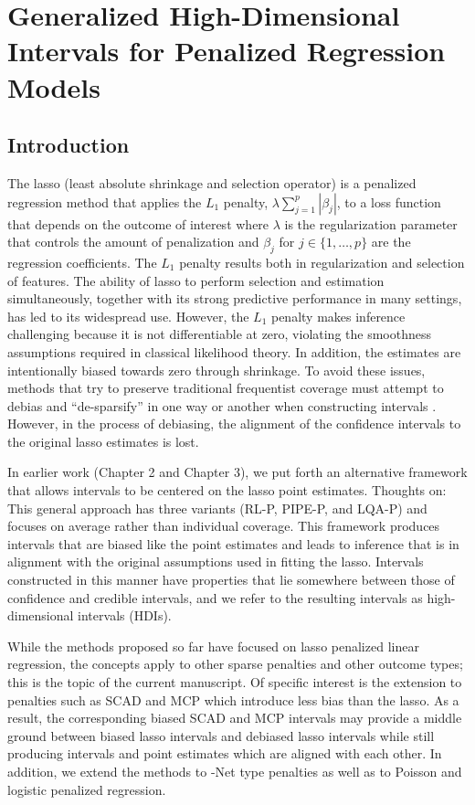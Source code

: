 \chapter{Generalized High-Dimensional Intervals for Penalized Regression Models}\label{sec:chap4}

\section{Introduction}

The lasso (least absolute shrinkage and selection operator) is a penalized regression method that applies the $L_1$ penalty, $\lambda \sum_{j = 1}^p |\beta_j|$, to a loss function that depends on the outcome of interest where $\lambda$ is the regularization parameter that controls the amount of penalization and $\beta_j$ for $j \in \lbrace 1, \dots, p \rbrace$ are the regression coefficients. The $L_1$ penalty results both in regularization and selection of features. The ability of lasso to perform selection and estimation simultaneously, together with its strong predictive performance in many settings, has led to its widespread use. However, the $L_1$ penalty makes inference challenging because it is not differentiable at zero, violating the smoothness assumptions required in classical likelihood theory. In addition, the estimates are intentionally biased towards zero through shrinkage. To avoid these issues, methods that try to preserve traditional frequentist coverage must attempt to debias and ``de-sparsify'' in one way or another when constructing intervals \citep{ZhangZhang2014, Javanmard2014, Lee2016}. However, in the process of debiasing, the alignment of the confidence intervals to the original lasso estimates is lost.

In earlier work (Chapter 2 and Chapter 3), we put forth an alternative framework that allows intervals to be centered on the lasso point estimates. Thoughts on: This general approach has three variants (RL-P, PIPE-P, and LQA-P) and focuses on average rather than individual coverage. This framework produces intervals that are biased like the point estimates and leads to inference that is in alignment with the original assumptions used in fitting the lasso. Intervals constructed in this manner have properties that lie somewhere between those of confidence and credible intervals, and we refer to the resulting intervals as high-dimensional intervals (HDIs).

While the methods proposed so far have focused on lasso penalized linear regression, the concepts apply to other sparse penalties and other outcome types; this is the topic of the current manuscript. Of specific interest is the extension to penalties such as SCAD \citep{Fan2001} and MCP \citep{Zhang2010} which introduce less bias than the lasso. As a result, the corresponding biased SCAD and MCP intervals may provide a middle ground between biased lasso intervals and debiased lasso intervals while still producing intervals and point estimates which are aligned with each other. In addition, we extend the methods to -Net type penalties as well as to Poisson and logistic penalized regression.

